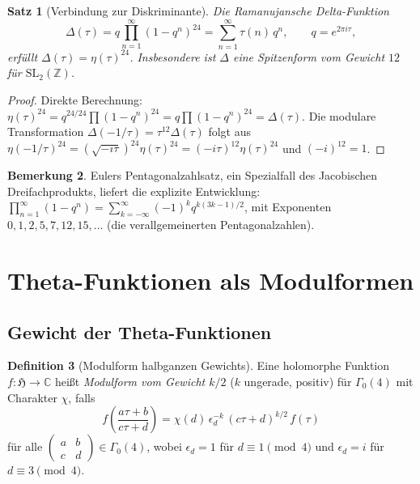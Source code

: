 \documentclass[12pt,a4paper]{amsart}
\newtheorem{theorem}{Satz}[section]
\theoremstyle{definition}
\newtheorem{definition}[theorem]{Definition}
\newtheorem{remark}[theorem]{Bemerkung}
\begin{document}
\begin{theorem}[Verbindung zur Diskriminante]\label{thm:delta}
Die Ramanujansche Delta-Funktion
\[
  \Delta(\tau) = q\prod_{n=1}^{\infty}(1-q^n)^{24} = \sum_{n=1}^{\infty}\tau(n)\,q^n,
  \qquad q = e^{2\pi i\tau},
\]
erfüllt $\Delta(\tau) = \eta(\tau)^{24}$.
Insbesondere ist $\Delta$ eine Spitzenform vom Gewicht $12$ für $\mathrm{SL}_2(\mathbb{Z})$.
\end{theorem}

\begin{proof}
Direkte Berechnung: $\eta(\tau)^{24} = q^{24/24}\prod(1-q^n)^{24} = q\prod(1-q^n)^{24} = \Delta(\tau)$.
Die modulare Transformation $\Delta(-1/\tau) = \tau^{12}\Delta(\tau)$ folgt aus
$\eta(-1/\tau)^{24} = (\sqrt{-i\tau})^{24}\eta(\tau)^{24} = (-i\tau)^{12}\eta(\tau)^{24}$
und $(-i)^{12} = 1$.
\end{proof}

\begin{remark}
Eulers Pentagonalzahlsatz, ein Spezialfall des Jacobischen Dreifachprodukts,
liefert die explizite Entwicklung:
$\prod_{n=1}^{\infty}(1-q^n) = \sum_{k=-\infty}^{\infty}(-1)^k q^{k(3k-1)/2}$,
mit Exponenten $0,1,2,5,7,12,15,\ldots$ (die verallgemeinerten Pentagonalzahlen).
\end{remark}

\section{Theta-Funktionen als Modulformen}\label{sec:modular}

\subsection{Gewicht der Theta-Funktionen}

\begin{definition}[Modulform halbganzen Gewichts]
Eine holomorphe Funktion $f : \mathfrak{H} \to \mathbb{C}$ heißt
\emph{Modulform vom Gewicht $k/2$} ($k$ ungerade, positiv) für $\Gamma_0(4)$
mit Charakter $\chi$, falls
\[
  f\!\left(\frac{a\tau+b}{c\tau+d}\right)
  = \chi(d)\,\epsilon_d^{-k}\,(c\tau+d)^{k/2}\,f(\tau)
\]
für alle $\begin{pmatrix}a&b\\c&d\end{pmatrix}\in\Gamma_0(4)$, wobei
$\epsilon_d = 1$ für $d\equiv 1\pmod{4}$ und $\epsilon_d = i$ für $d\equiv 3\pmod{4}$.
\end{definition}
\end{document}
